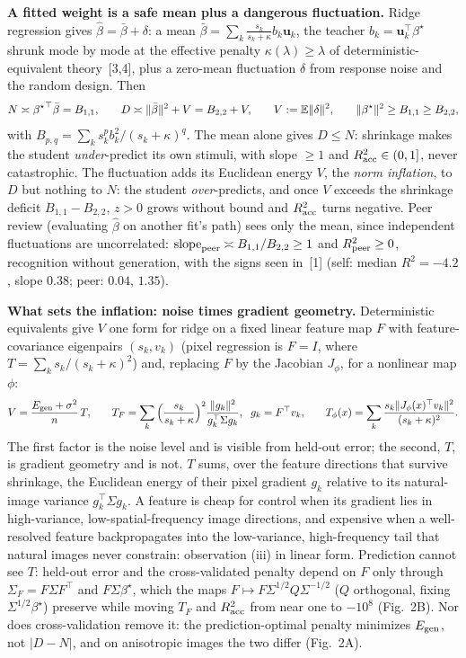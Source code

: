 \documentclass[12pt,letterpaper]{article}
\newcommand{\runsection}[1]{\par\vskip0pt plus 3\baselineskip\penalty-100\vskip0pt plus -3\baselineskip\vspace{1.5pt}\noindent\textbf{#1}\hspace{0.5em}\ignorespaces}
\newcommand{\bhat}{\hat{\beta}}
\newcommand{\bstar}{{\beta^{\star}}}
\newcommand{\uvec}{\mathbf{u}}
\newcommand{\E}{\mathbb{E}}
\begin{document}
\runsection{A fitted weight is a safe mean plus a dangerous fluctuation.}
Ridge regression gives $\bhat=\bar\beta+\delta$: a mean $\bar\beta=\sum_k\frac{s_k}{s_k+\kappa}b_k\uvec_k$, the teacher $b_k=\uvec_k^\top\bstar$ shrunk mode by mode at the effective penalty $\kappa(\lambda)\ge\lambda$ of deterministic-equivalent theory~[3,4], plus a zero-mean fluctuation $\delta$ from response noise and the random design. Then
\begin{equation}\small
N\asymp\bstar^\top\bar\beta=B_{1,1},\qquad
D\asymp\|\bar\beta\|^2+V=B_{2,2}+V,\qquad V:=\E\|\delta\|^2,\qquad
\|\bstar\|^2\ge B_{1,1}\ge B_{2,2},
\label{eq:de}
\end{equation}
with $B_{p,q}=\sum_k s_k^pb_k^2/(s_k+\kappa)^q$. The mean alone gives $D\le N$: shrinkage makes the student \emph{under}-predict its own stimuli, with slope $\ge1$ and $R^2_{\rm acc}\in(0,1]$, never catastrophic. The fluctuation adds its Euclidean energy $V$, the \emph{norm inflation}, to $D$ but nothing to $N$: the student \emph{over}-predicts, and once $V$ exceeds the shrinkage deficit $B_{1,1}-B_{2,2}$, $z>0$ grows without bound and $R^2_{\rm acc}$ turns negative. Peer review (evaluating $\bhat$ on another fit's path) sees only the mean, since independent fluctuations are uncorrelated: $\mathrm{slope}_{\rm peer}\asymp B_{1,1}/B_{2,2}\ge1$ and $R^2_{\rm peer}\ge0$, recognition without generation, with the signs seen in~[1] (self: median $R^2=-4.2$, slope $0.38$; peer: $0.04$, $1.35$).

\runsection{What sets the inflation: noise times gradient geometry.}
Deterministic equivalents give $V$ one form for ridge on a fixed linear feature map $F$ with feature-covariance eigenpairs $(s_k,v_k)$ (pixel regression is $F=I$, where $T=\sum_k s_k/(s_k+\kappa)^2$) and, replacing $F$ by the Jacobian $J_\phi$, for a nonlinear map $\phi$:
\begin{equation}\small
V=\frac{E_{\rm gen}+\sigma^2}{n}\,T,\qquad
T_F=\sum_k\Big(\frac{s_k}{s_k+\kappa}\Big)^2\frac{\|g_k\|^2}{g_k^\top\Sigma g_k},\ \ g_k=F^\top v_k,\qquad
T_\phi(x)=\sum_k\frac{s_k\|J_\phi(x)^\top v_k\|^2}{(s_k+\kappa)^2}.
\label{eq:T}
\end{equation}
The first factor is the noise level and is visible from held-out error; the second, $T$, is gradient geometry and is not. $T$ sums, over the feature directions that survive shrinkage, the Euclidean energy of their pixel gradient $g_k$ relative to its natural-image variance $g_k^\top\Sigma g_k$. A feature is cheap for control when its gradient lies in high-variance, low-spatial-frequency image directions, and expensive when a well-resolved feature backpropagates into the low-variance, high-frequency tail that natural images never constrain: observation (iii) in linear form. Prediction cannot see $T$: held-out error and the cross-validated penalty depend on $F$ only through $\Sigma_F=F\Sigma F^\top$ and $F\Sigma\bstar$, which the maps $F\mapsto F\Sigma^{1/2}Q\Sigma^{-1/2}$ ($Q$ orthogonal, fixing $\Sigma^{1/2}\bstar$) preserve while moving $T_F$ and $R^2_{\rm acc}$ from near one to $-10^8$ (Fig.~2B). Nor does cross-validation remove it: the prediction-optimal penalty minimizes $E_{\rm gen}$, not $|D-N|$, and on anisotropic images the two differ (Fig.~2A).
\end{document}
